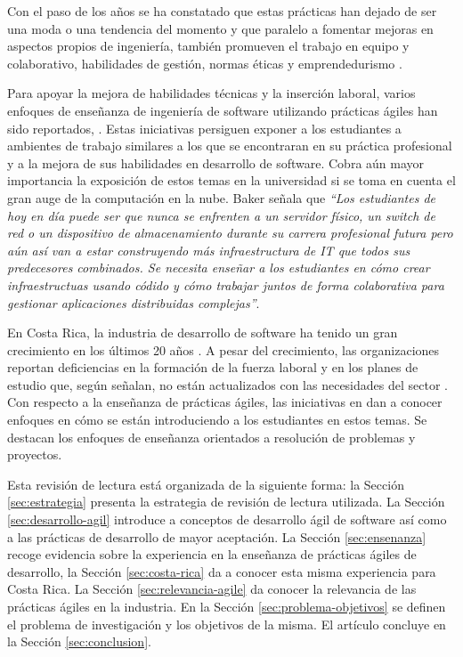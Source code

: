 \documentclass[journal]{IEEEtran}
\begin{document}
Con el paso de los años se ha constatado que estas prácticas han dejado de ser una moda o una tendencia del momento y que paralelo a fomentar mejoras en aspectos propios de ingeniería, también promueven el trabajo en equipo y colaborativo, habilidades de gestión, normas éticas y emprendedurismo \cite{hazzan-dubinsky, hickey-salas}. 

Para apoyar la mejora de habilidades técnicas y la inserción laboral, varios enfoques de enseñanza de ingeniería de software utilizando prácticas ágiles han sido reportados, \cite{ding-yousef-yue, steghoger-et-al, scharlau, schroeder-et-al, cubric, haaranen-lehtinen, kropp-meier-2}. Estas iniciativas persiguen exponer a los estudiantes a ambientes de trabajo similares a los que se encontraran en su práctica profesional y a la mejora de sus habilidades en desarrollo de software. Cobra aún mayor importancia la exposición de estos temas en la universidad si se toma en cuenta el gran auge de la computación en la nube. Baker \cite{advance-it} señala que \emph{``Los estudiantes de hoy en día puede ser que nunca se enfrenten a un servidor físico, un switch de red o un dispositivo de almacenamiento durante su carrera profesional futura pero aún así van a estar construyendo más infraestructura de IT que todos sus predecesores combinados. Se necesita enseñar a los estudiantes en cómo crear infraestructuas usando códido y cómo trabajar juntos de forma colaborativa para gestionar aplicaciones distribuidas complejas''}. 


En Costa Rica, la industria de desarrollo de software ha tenido un gran crecimiento en los últimos 20 años \cite{cenfotec-2, prosic}. A pesar del crecimiento, las organizaciones reportan deficiencias en la formación de la fuerza laboral y en los planes de estudio que, según señalan, no están actualizados con las necesidades del sector \cite{prosic}. Con respecto a la enseñanza de prácticas ágiles, las iniciativas en \cite{trejos-1, salazar, mora-et-al-1, mora-et-al-2} dan a conocer enfoques en cómo se están introduciendo a los estudiantes en estos temas. Se destacan los enfoques de enseñanza orientados a resolución de problemas y proyectos.

Esta revisión de lectura está organizada de la siguiente forma: la Sección \ref{sec:estrategia} presenta la estrategia de revisión de lectura utilizada. La Sección \ref{sec:desarrollo-agil} introduce a conceptos de desarrollo ágil de software así como a las prácticas de desarrollo de mayor aceptación. La Sección \ref{sec:ensenanza} recoge evidencia sobre la experiencia en la enseñanza de prácticas ágiles de desarrollo, la Sección \ref{sec:costa-rica} da a conocer esta misma experiencia para Costa Rica. La Sección \ref{sec:relevancia-agile} da conocer la relevancia de las prácticas ágiles en la industria. En la Sección \ref{sec:problema-objetivos} se definen el problema de investigación y los objetivos de la misma. El artículo concluye en la Sección \ref{sec:conclusion}.
\end{document}
